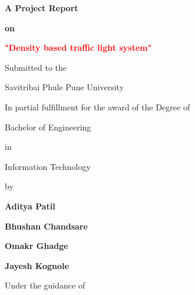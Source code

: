 \documentclass[12pt,a4paper]{report}
\begin{document}
 
\begin{center}
	\textbf{\Large{A Project Report}}
\end{center}

\begin{center}
	\textbf{on}
\end{center}

\begin{center}
	\textbf{ \Large{\textcolor{red}{ "Density based traffic light system"}}}
\end{center}

\begin{center}
	Submitted to the 
\end{center}

\begin{center}
	\large{Savitribai Phule Pune University} 
\end{center}

\begin{center}
	In partial fulfillment for the award of the Degree of
\end{center}

\begin{center}
	\large{Bachelor of Engineering} 
\end{center}

\begin{center}
	in
\end{center}

\begin{center}
	\large{Information Technology}
\end{center}

\begin{center}
	by
\end{center}

\begin{center}
	\textbf{\Large {Aditya Patil}}
\end{center}
\begin{center}
	\textbf{\Large {Bhushan Chandsare}}
\end{center}
\begin{center}
	\textbf{\Large {Omakr Ghadge}}
\end{center}
\begin{center}
	\textbf{\Large {Jayesh Kognole}}
\end{center}

\begin{center}
	Under the guidance of
\end{center}
\end{document}
